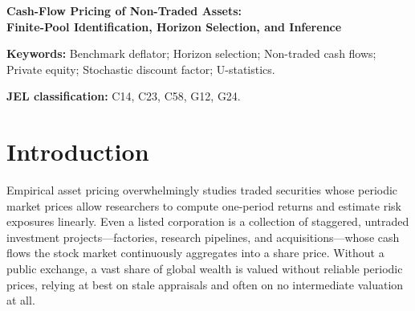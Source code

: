 \documentclass[12pt]{article}
\newif\ifBlindMode
\begin{document}
\unless\ifBlindMode
  
\fi

\begin{center}
  {\Large\bfseries Cash-Flow Pricing of Non-Traded Assets: \\[0.5ex] Finite-Pool Identification, Horizon Selection, and Inference\par}
\end{center}
\vspace{0.5em}

\begin{abstract}
\singlespacing
\noindent Private companies, private capital funds, real assets, and illiquid credit represent a vast share of global wealth, yet lack reliable market prices, making irregular cash flows a primary basis for measuring their risk and performance.
Standard methods estimate risk exposures from pooled or cohort-grouped cash flows by minimizing squared net present values.
We show that nonlinear discounting creates a finite-pool bias: because higher discount rates mechanically shrink payoff dispersion, squared-loss estimators can remain biased even as the number of cohorts grows large.
We introduce a cross-unit pair-product estimator that eliminates idiosyncratic variance bias with as few as two units per cohort.
Under shared cohort shocks, pooling alone cannot eliminate the bias; we show how forward compounding to a duration-matched horizon cancels first-order bias and prevents boundary collapse.
We establish valid small-sample (fixed-$b$) and identification-robust inference, and demonstrate substantial bias reduction in simulations and North American private equity cash flows.
\end{abstract}

\noindent\textbf{Keywords:} Benchmark deflator; Horizon selection; Non-traded cash flows; Private equity; Stochastic discount factor; U-statistics.

\noindent\textbf{JEL classification:} C14, C23, C58, G12, G24.

\newpage

\section{Introduction}
\label{sec:introduction}

Empirical asset pricing overwhelmingly studies traded securities whose periodic market prices allow researchers to compute one-period returns and estimate risk exposures linearly.
Even a listed corporation is a collection of staggered, untraded investment projects---factories, research pipelines, and acquisitions---whose cash flows the stock market continuously aggregates into a share price.
Without a public exchange, a vast share of global wealth is valued without reliable periodic prices, relying at best on stale appraisals \citep{BGK19,JLRS20,brown2023nowcasting} and often on no intermediate valuation at all.
\end{document}
